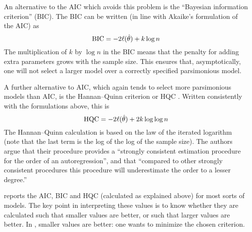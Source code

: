 An alternative to the AIC which avoids this problem is the
\cite{schwarz78} ``Bayesian information criterion'' (BIC).  The BIC
can be written (in line with Akaike's formulation of the AIC) as
%
\[
{\rm BIC} = -2 \ell(\hat{\theta}) + k \log n
\]
The multiplication of $k$ by $\log n$ in the BIC means that the
penalty for adding extra parameters grows with the sample size.  This
ensures that, asymptotically, one will not select a larger model over
a correctly specified parsimonious model.

A further alternative to AIC, which again tends to select more
parsimonious models than AIC, is the Hannan--Quinn criterion or HQC
\citep{hannan-quinn79}.  Written consistently with the formulations
above, this is
%
\[
{\rm HQC} = -2 \ell(\hat{\theta}) + 2k \log \log n
\]
%
The Hannan--Quinn calculation is based on the law of the iterated
logarithm (note that the last term is the log of the log of the sample
size).  The authors argue that their procedure provides a ``strongly
consistent estimation procedure for the order of an autoregression'',
and that ``compared to other strongly consistent procedures this
procedure will underestimate the order to a lesser degree.''

\vspace{1ex}

 reports the AIC, BIC and HQC (calculated as explained above) for
most sorts of models.  The key point in interpreting these values is
to know whether they are calculated such that smaller values are
better, or such that larger values are better.  In , smaller
values are better: one wants to minimize the chosen criterion.





